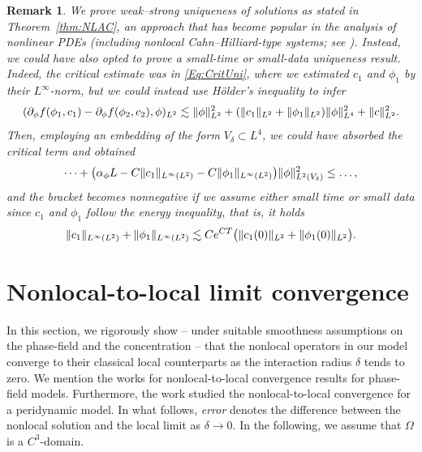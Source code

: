 \documentclass[]{article}
\newtheorem{remark}{Remark}[section]
\DeclarePairedDelimiter{\norm}{\lVert}{\rVert}
\begin{document}
\begin{remark}
	We prove weak--strong uniqueness of solutions as stated in Theorem~\ref{thm:NLAC}, an approach that has become popular in the analysis of nonlinear PDEs (including nonlocal Cahn--Hilliard-type systems; see \cite{brunk2023stability,giorgini2019uniqueness,huo2023existence,frigeri2016nonlocal}). Instead, we could have also opted to prove a small-time or small-data uniqueness result. Indeed, the critical estimate was in \eqref{Eq:CritUni}, where we estimated $c_1$ and $\phi_1$ by their $L^\infty$-norm, but we could instead use H\"older's inequality to infer
	$$(\partial_\phi f(\phi_1,c_1)
	-\partial_\phi f(\phi_2,c_2), \phi)_{L^2}  \lesssim \norm{\phi}^2_{L^2} + (\norm{c_1}_{L^2}+\norm{\phi_1}_{L^2}) \norm{\phi}^2_{L^4}+ \norm{c}^2_{L^2}.$$
	Then, employing an embedding of the form $V_\delta \subset L^4$, we could have absorbed the critical term and obtained
	$$\dots + \bigl(\alpha_\phi L - C\norm{c_1}_{L^\infty(L^2)}-C\norm{\phi_1}_{L^\infty(L^2)}\bigr)\norm{\phi}_{L^2(V_\delta)}^2 \leq \dots,$$
	and the bracket becomes nonnegative if we assume either small time or small data since $c_1$ and $\phi_1$ follow the energy inequality, that is, it holds
	$$\norm{c_1}_{L^\infty(L^2)}+\norm{\phi_1}_{L^\infty(L^2)} \lesssim Ce^{CT} \bigl(\|c_1(0)\|_{L^2} +  \|\phi_1(0)\|_{L^2}\bigr).$$
\end{remark}

\section{Nonlocal-to-local limit convergence}
\label{sec:limit}

In this section, we rigorously show -- under suitable smoothness assumptions on the phase-field and the concentration -- that the nonlocal operators in our model converge to their classical local counterparts as the interaction radius $\delta$ tends to zero. We mention the works \cite{abels2024strong,abels2024acflow,elbar2023degenerate,davoli2021nonlocal,trussardi2019nonlocal} for nonlocal-to-local convergence results for phase-field models. Furthermore, the work \cite{pelech2019peridynamic} studied the nonlocal-to-local convergence for a peridynamic model. In what follows, \emph{error} denotes the difference between the nonlocal solution and the local limit as $\delta\to0$. In the following, we assume that $\Omega$ is a $C^3$-domain. 
\end{document}

